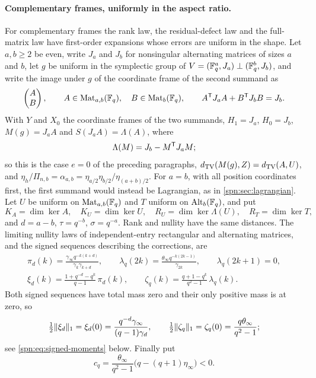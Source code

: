 \paragraph{Complementary frames, uniformly in the aspect ratio.}
For complementary frames the rank law, the residual-defect law and the full-matrix law have
first-order expansions whose errors are uniform in the shape. Let $a,b\ge2$ be even, write
$J_a$ and $J_b$ for nonsingular alternating matrices of sizes $a$ and $b$, let $g$ be uniform in the
symplectic group of $V=(\mathbb{F}_q^a,J_a)\perp(\mathbb{F}_q^b,J_b)$, and write the image under $g$ of the
coordinate frame of the second summand as
\begin{equation}\label{spn:eq:block-frame}
 \begin{pmatrix}A\\B\end{pmatrix},\qquad A\in\operatorname{Mat}_{a,b}(\mathbb{F}_q),\quad B\in\operatorname{Mat}_b(\mathbb{F}_q),\qquad
 A^{\mathsf{T}}J_aA+B^{\mathsf{T}}J_bB=J_b .
\end{equation}
With $Y$ and $X_0$ the coordinate frames of the two summands, $H_1=J_a$, $H_0=J_b$, $M(g)=J_aA$ and
$S(J_aA)=\Lambda(A)$, where
\[
 \Lambda(M)=J_b-M^{\mathsf{T}}J_aM ;
\]
so this is the case $e=0$ of the preceding paragraphs, $d_{\mathrm{TV}}(M(g),Z)=d_{\mathrm{TV}}(A,U)$, and
$\eta_h/\Pi_{n,b}=\alpha_{a,b}=\eta_{a/2}\eta_{b/2}/\eta_{(a+b)/2}$. For $a=b$, with all position
coordinates first, the first summand would instead be Lagrangian, as in \cref{spn:sec:lagrangian}.
Let $U$ be uniform on $\operatorname{Mat}_{a,b}(\mathbb{F}_q)$ and $T$ uniform on $\operatorname{Alt}_b(\mathbb{F}_q)$, and put
\[
 K_A=\dim\ker A,\quad K_U=\dim\ker U,\quad R_U=\dim\ker\Lambda(U),\quad R_T=\dim\ker T,
\]
and $d=a-b$, $\tau=q^{-b}$, $\sigma=q^{-a}$.
Rank and nullity have the same distances. The limiting nullity laws of independent-entry
rectangular and alternating matrices, and the signed sequences describing the corrections, are
\begin{gather}
 \pi_d(k)=\frac{\gamma_\infty q^{-k(k+d)}}{\gamma_k\gamma_{k+d}},\qquad
 \lambda_q(2k)=\frac{\theta_\infty q^{-k(2k-1)}}{\gamma_{2k}},\qquad \lambda_q(2k+1)=0,
 \label{spn:eq:limit-laws}\\
 \xi_d(k)=\frac{1+q^{-d}-q^k}{q-1}\,\pi_d(k),\qquad
 \zeta_q(k)=\frac{q+1-q^k}{q^2-1}\,\lambda_q(k).\label{spn:eq:signed-laws}
\end{gather}
Both signed sequences have total mass zero and their only positive mass is at zero, so
\begin{equation}\label{spn:eq:signed-norms}
 \tfrac12\lVert\xi_d\rVert_1=\xi_d(0)=\frac{q^{-d}\gamma_\infty}{(q-1)\gamma_d},\qquad
 \tfrac12\lVert\zeta_q\rVert_1=\zeta_q(0)=\frac{q\theta_\infty}{q^2-1};
\end{equation}
see \eqref{spn:eq:signed-moments} below. Finally put
\[
 c_q=\frac{\theta_\infty}{q^2-1}\bigl(q-(q+1)\eta_\infty\bigr)<0 .
\]

